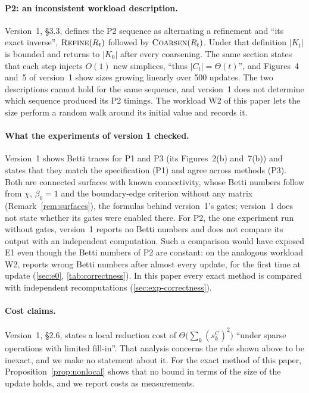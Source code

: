 \paragraph{P2: an inconsistent workload description.}
Version~1, \S3.3, defines the P2 sequence as alternating a refinement and ``its
exact inverse'', $\textsc{Refine}(R_t)$ followed by $\textsc{Coarsen}(R_t)$. Under
that definition $|K_t|$ is bounded and returns to $|K_0|$ after every
coarsening. The same section states that each step injects $O(1)$ new
simplices, ``thus $|C_t|=\Theta(t)$'', and Figures~4 and~5 of version~1 show
sizes growing linearly over 500 updates. The two descriptions cannot hold for
the same sequence, and version~1 does not determine which sequence produced its
P2 timings. The workload W2 of this paper lets the size perform a random walk
around its initial value and records it.

\paragraph{What the experiments of version 1 checked.}
Version~1 shows Betti traces for P1 and P3 (its Figures~2(b) and~7(b)) and
states that they match the specification (P1) and agree across methods (P3).
Both are connected surfaces with
known connectivity, whose Betti numbers follow from $\chi$, $\beta_0=1$ and the
boundary-edge criterion without any matrix (Remark~\ref{rem:surfaces}), the
formulas behind version~1's gates; version~1 does not state whether its gates
were enabled there. For P2, the one experiment run without gates, version~1
reports no Betti numbers and does not compare its output with an independent
computation. Such a comparison would have exposed E1 even though the Betti
numbers of P2 are constant: on the analogous workload W2,  reports
wrong Betti numbers after almost every update, for the first time at update
\NumLcrWTwoNFifteenSEightFirstWrong{} (\cref{sec:e0}, \cref{tab:correctness}). In this paper every exact method is compared with independent
recomputations (\cref{sec:exp-correctness}).

\paragraph{Cost claims.}
Version~1, \S2.6, states a local reduction cost of
$\Theta\bigl(\sum_k (s_k^C)^2\bigr)$ ``under sparse operations with limited
fill-in''. That analysis concerns the rule shown above to be inexact, and we
make no statement about it. For the exact method of this paper,
Proposition~\ref{prop:nonlocal} shows that no bound in terms of the size of the
update holds, and we report costs as measurements.
